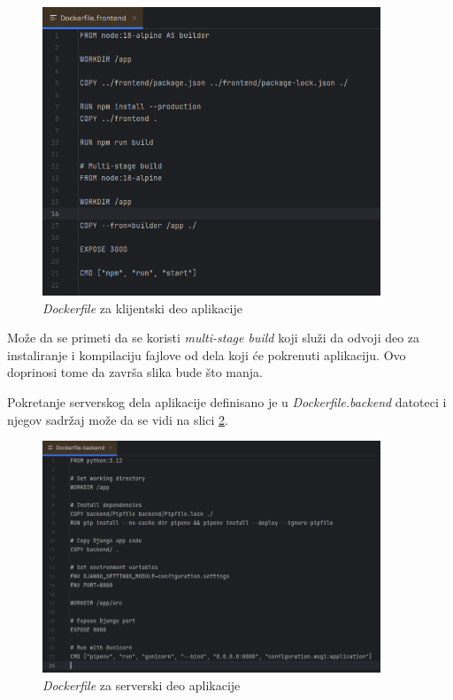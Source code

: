 \documentclass[12pt,oneside]{memoir}
\begin{document}
\begin{figure}[h]
\centering
\includegraphics[width=0.9\textwidth]{images/docker_frontend.png}
\caption{\emph{Dockerfile} za klijentski deo aplikacije}
\label{fig:docker_frontend}
\end{figure}

Može da se primeti da se koristi \emph{multi-stage build} koji služi da odvoji deo za instaliranje i kompilaciju fajlove od dela koji će pokrenuti aplikaciju. Ovo doprinosi tome da završa slika bude što manja.

Pokretanje serverskog dela aplikacije definisano je u \emph{Dockerfile.backend} datoteci i njegov sadržaj može da se vidi na slici \ref{fig:docker_backend}.

\begin{figure}[h]
\centering
\includegraphics[width=0.9\textwidth]{images/docker_backend.png}
\caption{\emph{Dockerfile} za serverski deo aplikacije}
\label{fig:docker_backend}
\end{figure}
\end{document}
